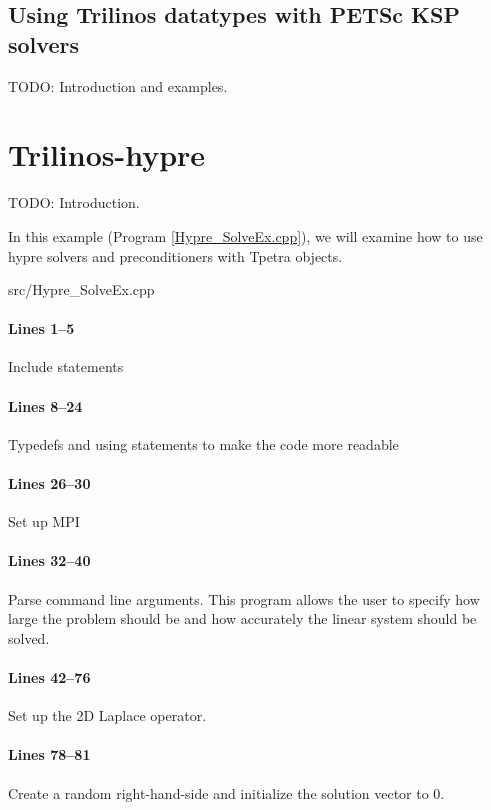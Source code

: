 \documentclass[pdf,12pt,report,strict]{SANDreport}
\begin{document}
\subsection{Using Trilinos datatypes with PETSc KSP solvers}
{\color{red}TODO: Introduction and examples.}

\section{Trilinos-hypre}
{\color{red}TODO: Introduction.}

In this example (Program \ref{Hypre_SolveEx.cpp}), we will examine how to use
hypre solvers and preconditioners with Tpetra objects.

\begin{lstinputlisting}[caption=Hypre\_SolveEx.cpp,label=Hypre_SolveEx.cpp]{src/Hypre_SolveEx.cpp}
\end{lstinputlisting}

\paragraph{Lines 1--5}
Include statements

\paragraph{Lines 8--24}
Typedefs and using statements to make the code more readable

\paragraph{Lines 26--30}
Set up MPI

\paragraph{Lines 32--40}
Parse command line arguments.  This program allows the user to specify how large
the problem should be and how accurately the linear system should be solved.

\paragraph{Lines 42--76}
Set up the 2D Laplace operator.

\paragraph{Lines 78--81}
Create a random right-hand-side and initialize the solution vector to 0.
\end{document}

